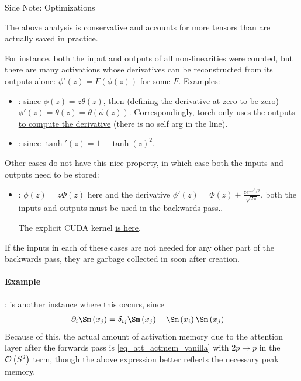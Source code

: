 \documentclass[11pt]{article}
\begin{document}
\begin{commentbox}{Side Note: Optimizations}

The above analysis is conservative and accounts for more tensors than are actually saved in
practice.\newline

For instance, both the input and outputs of all non-linearities were counted, but there are many
activations whose derivatives can be reconstructed from its outputs alone: $ \phi'(z)=F \left (
\phi(z) \right ) $ for some $ F $. Examples:
\begin{itemize}
    \item {}: since $ \phi(z)= z\theta(z) $, then (defining the derivative at zero to
        be zero) $ \phi'(z) =\theta(z) = \theta \left ( \phi(z) \right) $. Correspondingly, torch
        only uses the  outputs \href{https://github.com/pytorch/pytorch/blob/73d288fdf9d0beb76229cabc8566ee116f8a21a2/tools/autograd/derivatives.yaml#L2009-L2011}{to compute the derivative}
        (there is no self arg in the  line).
    \item  {}: since $ \tanh'(z)=1-\tanh(z) ^{ 2 } $.
\end{itemize}
Other cases do not have this nice property, in which case both the inputs and outputs need to
be stored:
\begin{itemize}
    \item {} \cite{hendrycks2023gaussian}: $ \phi(z)=z\Phi(z) $ here and the derivative
        $ \phi'(z)= \Phi(z) + \frac{ z e^{ -z ^{ 2 } /2 } }{\sqrt{2\pi}  } $, both the inputs and
        outputs \href{https://github.com/pytorch/pytorch/blob/73d288fdf9d0beb76229cabc8566ee116f8a21a2/tools/autograd/derivatives.yaml#L2041-L2044}{must be used in the backwards pass.}.

        The explicit CUDA kernel \href{https://github.com/pytorch/pytorch/blob/73d288fdf9d0beb76229cabc8566ee116f8a21a2/aten/src/ATen/native/cuda/ActivationGeluKernel.cu#L70-L84}{is here}.
\end{itemize}
If the inputs in each of these cases are not needed for any other part of the backwards pass, they
are garbage collected in  soon after creation.


\paragraph{Example}:  is another instance where this occurs, since
\begin{align}
     \partial _{ i } \Sm \left ( x _{ j } \right )  &= \delta _{ ij }\Sm \left ( x _{ j } \right ) -   \Sm \left ( x _{ i } \right )  \Sm \left ( x _{ j } \right ) \label{eq_softmax_derivative}
\end{align}
Because of this, the actual amount of activation memory due to the attention layer after the
forwards pass is \eqref{eq_att_actmem_vanilla} with $ 2p \longrightarrow p $ in the $ \mathcal{O} \left( S
^{ 2 } \right)  $ term, though the above expression better reflects the necessary peak memory.

\end{commentbox}
\end{document}
